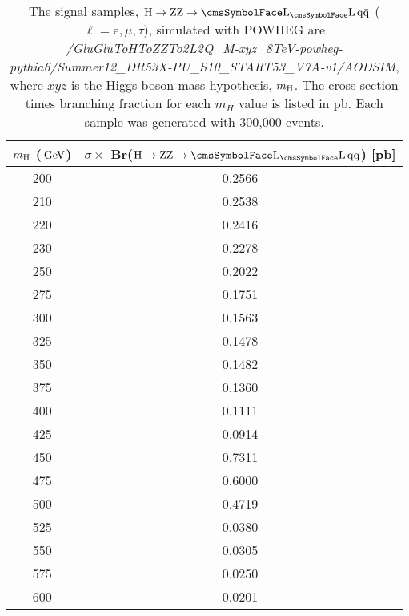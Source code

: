 \begin{table}
\caption{ 
The signal samples, $\Htollqq$ ($\ell = \mathrm{e}, \mu, \tau$),
simulated with POWHEG are
\textit{/GluGluToHToZZTo2L2Q\_M-xyz\_8TeV-powheg-pythia6/Summer12\_DR53X-PU\_S10\_START53\_V7A-v1/AODSIM}, where $xyz$ is the Higgs boson mass hypothesis, $m_{\mathrm{H}}$. The cross section times branching fraction for each $m_H$ value is listed in pb. Each sample was generated with 300,000 events.}
\label{table-mcsignal}
\vspace*{\medskipamount}
\begin{center}
\small
\begin{tabular}{|c|c|}
\hline
$m_{\mathrm{H}}$ ($\,\text{Ge\hspace{-.08em}V}$) & $\sigma\times$ Br($\Htollqq$) [pb] \\ \hline
200  &  0.2566 \\ %
 210  &  0.2538  \\ %
 220  &  0.2416  \\ %
 230  &  0.2278  \\ %
 250  &  0.2022 \\ %
 275  &  0.1751  \\ %
 300  &  0.1563  \\ %
 325  &  0.1478  \\ %
 350  &  0.1482  \\         
 375  &  0.1360  \\       
 400  &  0.1111 \\ %
 425  &  0.0914 \\ %
 450  &  0.7311 \\ %
 475  &  0.6000 \\ %
 500  &  0.4719 \\ %
  525  &  0.0380 \\ %
  550  &  0.0305 \\ %
 575  &  0.0250 \\ %
  600  &  0.0201 \\ \hline 
 
\end{tabular}
\end{center}
\end{table}
